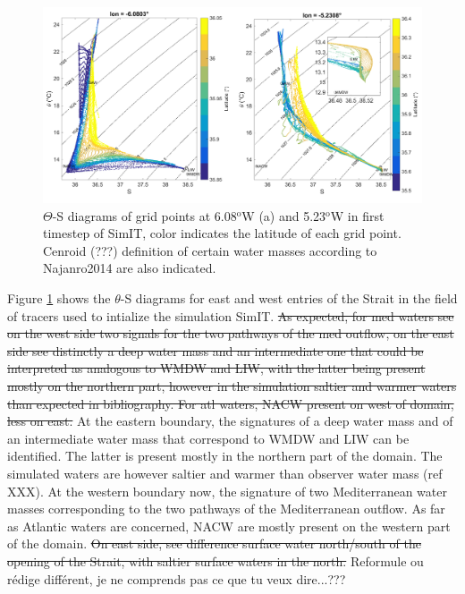 \begin{figure}[!h]
        \includegraphics[width=\textwidth]{./GBR3D/WM_ini_IES.png}
        \caption{$\Theta$-S diagrams of grid points at 6.08$^\text{o}$W (a) and 5.23$^\text{o}$W in first timestep of SimIT, color indicates the latitude of each grid point. Cenroid  \color{green} (???) \color{black}definition of certain water masses according to Najanro2014 are also indicated.}
        \label{Fig_Ini_WM3D}
\end{figure}


Figure \ref{Fig_Ini_WM3D} shows the $\theta$-S diagrams for east and west entries of the Strait in  \color{blue}the field of tracers used to intialize the \color{black} simulation SimIT. 
\sout{As expected, for med waters see on the west side two signals for the two pathways of the med outflow, on the east side see distinctly a deep water mass and an intermediate one that could be interpreted as analogous to WMDW and LIW, with the latter being present mostly on the northern part, however in the simulation saltier and warmer waters than expected in bibliography. For atl waters, NACW present on west of domain, less on east.}
\color{blue}At the eastern boundary, the signatures of a deep water mass and of an intermediate water mass that correspond to WMDW and LIW can be identified. The latter is present mostly in the northern part of the domain. The simulated waters are however saltier and warmer than observer water mass (ref XXX).
At the western boundary now, the signature of two Mediterranean water masses corresponding to the two pathways of the Mediterranean outflow. 
As far as Atlantic waters are concerned, NACW are mostly present on the western part of the domain. 
\sout{On east side, see difference surface water north/south of the opening of the Strait, with saltier surface waters in the north. } \color{green} Reformule ou rédige différent, je ne comprends pas ce que tu veux dire...??? \color{black}



